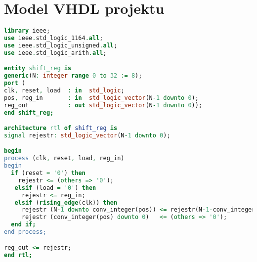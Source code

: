 \chapter{Model VHDL projektu}

\begin{lstlisting}[language=VHDL, xleftmargin=0pt, backgroundcolor={\color{white}}, caption={}, frame=""]
library ieee;
use ieee.std_logic_1164.all;
use ieee.std_logic_unsigned.all;
use ieee.std_logic_arith.all;

entity shift_reg is
generic(N: integer range 0 to 32 := 8);
port (
clk, reset, load  : in  std_logic;
pos, reg_in       : in  std_logic_vector(N-1 downto 0);
reg_out           : out std_logic_vector(N-1 downto 0));
end shift_reg;

architecture rtl of shift_reg is
signal rejestr: std_logic_vector(N-1 downto 0);

begin
process (clk, reset, load, reg_in)
begin
  if (reset = '0') then 
    rejestr <= (others => '0');
   elsif (load = '0') then
     rejestr <= reg_in;
   elsif (rising_edge(clk)) then
     rejestr (N-1 downto conv_integer(pos)) <= rejestr(N-1-conv_integer(pos) downto 0);
     rejestr (conv_integer(pos) downto 0)   <= (others => '0');
  end if;
end process;

reg_out <= rejestr;
end rtl;
\end{lstlisting}
